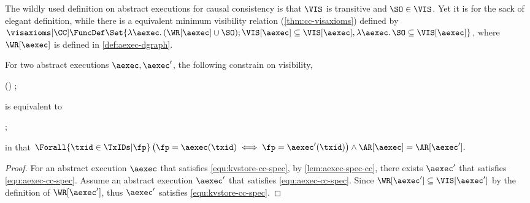 The wildly used definition on abstract executions for causal consistency is that 
\( \VIS \) is transitive and \( \SO \in \VIS \).
Yet it is for the sack of elegant definition,
while there is a equivalent minimum visibility relation (\cref{thm:cc-visaxioms}) defined by 
\( \visaxioms[\CC] \FuncDef \Set{ \lambda \aexec \ldotp (\WR[\aexec] \cup \SO) ; \VIS[\aexec] \subseteq \VIS[\aexec] , 
                                    \lambda \aexec \ldotp \SO \subseteq \VIS[\aexec]} \),
where \( \WR[\aexec] \) is defined in \cref{def:aexec-dgraph}.

\begin{theorem}
\label{thm:cc-visaxioms}
For two abstract executions \( \aexec,\aexec' \),
the following constrain on visibility,
\begin{Formulae}
\begin{Formula}
    (\WR[\aexec] \cup \SO) ; \VIS[\aexec] \subseteq \VIS[\aexec] \land \SO \subseteq \VIS[\aexec]
    \label{equ:kvstore-cc-spec}
\end{Formula}
\end{Formulae}
is equivalent to
\begin{Formulae}
\begin{Formula}
    \VIS[\aexec'] ; \VIS[\aexec'] \subseteq \VIS[\aexec'] \land \SO \subseteq \VIS[\aexec']
    \label{equ:aexec-cc-spec}
\end{Formula}
\end{Formulae}
in that 
\(
    \Forall{\txid \in \TxIDs | \fp } \left( \fp = \aexec(\txid) \iff \fp = \aexec'(\txid) \right)
    \land \AR[\aexec] = \AR[\aexec'] .
\)
\end{theorem}
\begin{proof}
For an abstract execution \( \aexec \) that satisfies \cref{equ:kvstore-cc-spec},
by \cref{lem:aexec-spec-cc}, there exists \( \aexec' \) that satisfies \cref{equ:aexec-cc-spec}.
Assume an abstract execution \( \aexec' \) that satisfies \cref{equ:aexec-cc-spec}.
Since \( \WR[\aexec'] \subseteq \VIS[\aexec']\) by the definition of \( \WR[\aexec']\),
thus \( \aexec' \) satisfies \cref{equ:kvstore-cc-spec}.
\end{proof}

